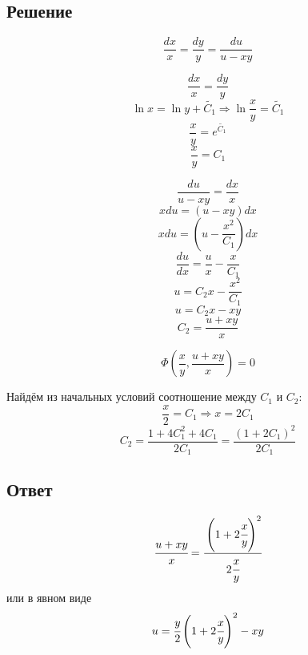 \documentclass[a4paper,10pt,notitlepage,pdftex,headsepline]{scrartcl}
\begin{document}
\subsection*{Решение}
\[\frac{dx}{x} = \frac{dy}{y} = \frac{du}{u - xy}\]

\[\frac{dx}{x} = \frac{dy}{y}\]
\[\ln{x} = \ln{y} + \tilde{C_1} \Rightarrow \ln{\frac{x}{y}} = \tilde{C_1}\]
\[\frac{x}{y} = e^{\tilde{C_1}}\]
\[\frac{x}{y} = C_1\]

\[\frac{du}{u-xy} = \frac{dx}{x}\]
\[x du = (u - xy) dx\]
\[x du = (u - \frac{x^2}{C_1}) dx\]
\[\frac{du}{dx}=\frac{u}{x}-\frac{x}{C_1}\]
\[u = C_2 x - \frac{x^2}{C_1}\]
\[u = C_2 x - x y\]
\[C_2 = \frac{u + x y}{x}\]

\[\Phi\left(\frac{x}{y}, \frac{u + xy}{x}\right) = 0\]

Найдём из начальных условий соотношение между $C_1$ и $C_2$:
\[\frac{x}{2} = C_1 \Rightarrow x = 2 C_1\]
\[C_2 = \frac{1+4 C_1^2 + 4 C_1}{2 C_1} = \frac{\left(1 + 2 C_1\right)^2}{2 C_1}\]
\subsection*{Ответ}
\[\cfrac{u + xy}{x} = \cfrac{\left(1+2 \cfrac{x}{y}\right)^2}{2\cfrac{x}{y}}\]
или в явном виде
\[u = \cfrac{y}{2}\left(1 + 2 \cfrac{x}{y}\right)^2 - x y\]
\end{document}
